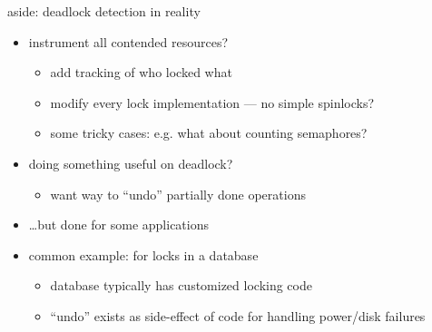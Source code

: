 
\begin{frame}{aside: deadlock detection in reality}
    \begin{itemize}
    \item instrument all contended resources?
        \begin{itemize}
        \item add tracking of who locked what
        \item modify every lock implementation --- no simple spinlocks?
        \item some tricky cases: e.g. what about counting semaphores?
        \end{itemize}
    \item doing something useful on deadlock?
        \begin{itemize}
        \item want way to ``undo'' partially done operations
        \end{itemize}
    \item \ldots but done for some applications
        \vspace{.5cm}
    \item common example: for locks in a database
        \begin{itemize}
        \item database typically has customized locking code
        \item ``undo'' exists as side-effect of code for handling power/disk failures
        \end{itemize}
    \end{itemize}
\end{frame}
